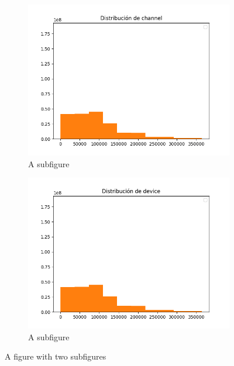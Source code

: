 \begin{figure}[H]
	\centering
	\begin{subfigure}{.5\textwidth}
		\centering
	\includegraphics[scale=0.5]{img/channel_distribution.png}
		\caption{A subfigure}
		\label{fig:sub1}
	\end{subfigure}%
	\begin{subfigure}{.5\textwidth}
		\centering
\includegraphics[scale=0.5]{img/device_distribution.png}
		\caption{A subfigure}
		\label{fig:sub2}
	\end{subfigure}
	\caption{A figure with two subfigures}
	\label{fig:test}
\end{figure}

